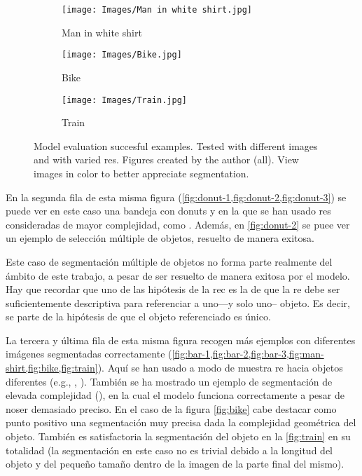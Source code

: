 \begin{figure}[p]
  \bigskip
  \begin{subfigure}[t]{.32\textwidth}
    \centering
    \caption{Man in white shirt}\label{fig:man-shirt}
    \texttt{[image: Images/Man in white shirt.jpg]}
  \end{subfigure}\hfill
  \begin{subfigure}[t]{.32\textwidth}
    \centering
    \caption{Bike}\label{fig:bike}
    \texttt{[image: Images/Bike.jpg]}
  \end{subfigure}\hfill
  \begin{subfigure}[t]{.32\textwidth}
    \centering
    \caption{Train}\label{fig:train}
    \texttt{[image: Images/Train.jpg]}
  \end{subfigure}
  \caption[Model evaluation succesful examples]{Model evaluation succesful
    examples. Tested with different images and with varied \glspl{re}. Figures
    created by the author (all). View images in color to better appreciate
    segmentation.}\label{fig:success}
\end{figure}

En la segunda fila de esta misma figura
(\vref{fig:donut-1,fig:donut-2,fig:donut-3}) se puede ver en este caso una
bandeja con donuts y en la que se han usado \glspl{re} consideradas de mayor
complejidad, como . Además, en \vref{fig:donut-2} se puee ver
un ejemplo de selección múltiple de objetos, resuelto de manera exitosa.

\begin{remarkBox}
  Este caso de segmentación múltiple de objetos no forma parte realmente del
  ámbito de este trabajo, a pesar de ser resuelto de manera exitosa por el
  modelo. Hay que recordar que uno de las hipótesis de la \gls{rec} es la de
  que la \gls{re} debe ser suficientemente descriptiva para referenciar a
  uno---y solo uno-- objeto. Es decir, se parte de la hipótesis de que el
  objeto referenciado es único.
\end{remarkBox}

La tercera y última fila de esta misma figura recogen más ejemplos con
diferentes imágenes segmentadas correctamente
(\vref{fig:bar-1,fig:bar-2,fig:bar-3,fig:man-shirt,fig:bike,fig:train}). Aquí
se han usado a modo de muestra \gls{re} hacia objetos diferentes (e.g.,
, ). También se ha mostrado un ejemplo de segmentación de
elevada complejidad (), en la cual el modelo funciona
correctamente a pesar de noser demasiado preciso. En el caso de la figura
\vref{fig:bike} cabe destacar como punto positivo una segmentación muy precisa
dada la complejidad geométrica del objeto. También es satisfactoria la
segmentación del objeto  en la \vref{fig:train} en su totalidad (la
segmentación en este caso no es trivial debido a la longitud del objeto y del
pequeño tamaño dentro de la imagen de la parte final del mismo).

